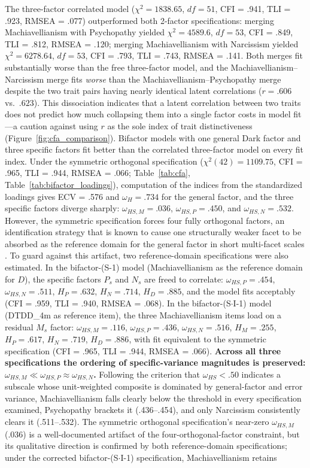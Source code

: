 \documentclass[11pt,twocolumn]{article}
\begin{document}
The three-factor correlated model ($\chi^2 = 1838.65$, $df = 51$, CFI = .941, TLI = .923, RMSEA = .077) outperformed both 2-factor specifications: merging Machiavellianism with Psychopathy yielded $\chi^2 = 4589.6$, $df = 53$, CFI = .849, TLI = .812, RMSEA = .120; merging Machiavellianism with Narcissism yielded $\chi^2 = 6278.64$, $df = 53$, CFI = .793, TLI = .743, RMSEA = .141. Both merges fit substantially worse than the free three-factor model, and the Machiavellianism--Narcissism merge fits \textit{worse} than the Machiavellianism--Psychopathy merge despite the two trait pairs having nearly identical latent correlations ($r = .606$ vs.\ $.623$). This dissociation indicates that a latent correlation between two traits does not predict how much collapsing them into a single factor costs in model fit---a caution against using $r$ as the sole index of trait distinctiveness (Figure~\ref{fig:cfa_comparison}). Bifactor models with one general Dark factor and three specific factors fit better than the correlated three-factor model on every fit index. Under the symmetric orthogonal specification ($\chi^2(42) = 1109.75$, CFI = .965, TLI = .944, RMSEA = .066; Table~\ref{tab:cfa}, Table~\ref{tab:bifactor_loadings}), computation of the \citet{rodriguez2016} indices from the standardized loadings gives ECV = .576 and $\omega_H = .734$ for the general factor, and the three specific factors diverge sharply: $\omega_{HS,M} = .036$, $\omega_{HS,P} = .450$, and $\omega_{HS,N} = .532$. However, the symmetric specification forces four fully orthogonal factors, an identification strategy that is known to cause one structurally weaker facet to be absorbed as the reference domain for the general factor in short multi-facet scales \citep{knitter2025, eid2017}. To guard against this artifact, two reference-domain specifications were also estimated. In the bifactor-(S-1) model (Machiavellianism as the reference domain for $D$), the specific factors $P_s$ and $N_s$ are freed to correlate: $\omega_{HS,P} = .454$, $\omega_{HS,N} = .511$, $H_P = .632$, $H_N = .714$, $H_D = .885$, and the model fits acceptably (CFI = .959, TLI = .940, RMSEA = .068). In the bifactor-(S$\cdot$I-1) model (DTDD\_4m as reference item), the three Machiavellianism items load on a residual $M_s$ factor: $\omega_{HS,M} = .116$, $\omega_{HS,P} = .436$, $\omega_{HS,N} = .516$, $H_M = .255$, $H_P = .617$, $H_N = .719$, $H_D = .886$, with fit equivalent to the symmetric specification (CFI = .965, TLI = .944, RMSEA = .066). \textbf{Across all three specifications the ordering of specific-variance magnitudes is preserved: $\omega_{HS,M} \ll \omega_{HS,P} \approx \omega_{HS,N}$.} Following the \citet{rodriguez2016} criterion that $\omega_{HS} < .50$ indicates a subscale whose unit-weighted composite is dominated by general-factor and error variance, Machiavellianism falls clearly below the threshold in every specification examined, Psychopathy brackets it (.436--.454), and only Narcissism consistently clears it (.511--.532). The symmetric orthogonal specification's near-zero $\omega_{HS,M}$ (.036) is a well-documented artifact of the four-orthogonal-factor constraint, but its qualitative direction is confirmed by both reference-domain specifications; under the corrected bifactor-(S$\cdot$I-1) specification, Machiavellianism retains 
\end{document}
